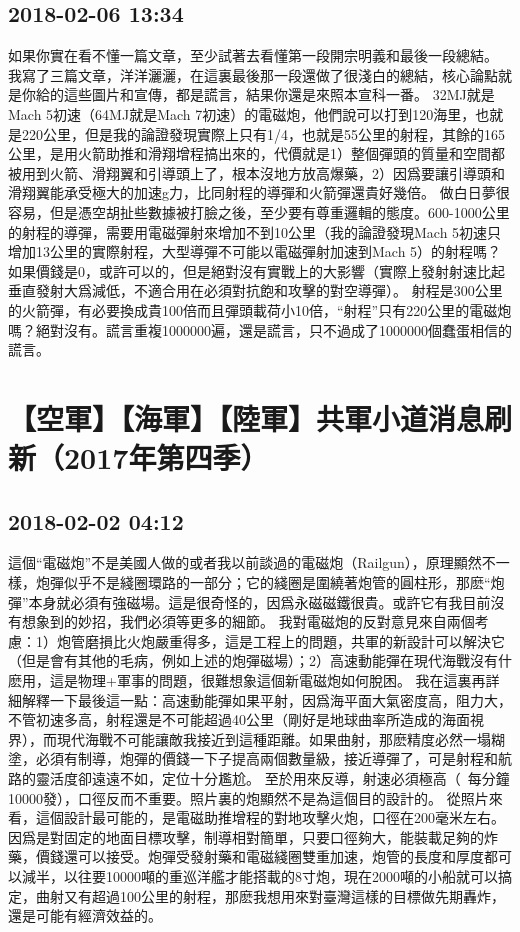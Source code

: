\documentclass[twocolumn]{ctexart}
\begin{document}
\subsection*{2018-02-06 13:34}

如果你實在看不懂一篇文章，至少試著去看懂第一段開宗明義和最後一段總結。
我寫了三篇文章，洋洋灑灑，在這裏最後那一段還做了很淺白的總結，核心論點就是你給的這些圖片和宣傳，都是謊言，結果你還是來照本宣科一番。
32MJ就是Mach 5初速（64MJ就是Mach 7初速）的電磁炮，他們說可以打到120海里，也就是220公里，但是我的論證發現實際上只有1/4，也就是55公里的射程，其餘的165公里，是用火箭助推和滑翔增程搞出來的，代價就是1）整個彈頭的質量和空間都被用到火箭、滑翔翼和引導頭上了，根本沒地方放高爆藥，2）因爲要讓引導頭和滑翔翼能承受極大的加速g力，比同射程的導彈和火箭彈還貴好幾倍。
做白日夢很容易，但是憑空胡扯些數據被打臉之後，至少要有尊重邏輯的態度。600-1000公里的射程的導彈，需要用電磁彈射來增加不到10公里（我的論證發現Mach 5初速只增加13公里的實際射程，大型導彈不可能以電磁彈射加速到Mach 5）的射程嗎？如果價錢是0，或許可以的，但是絕對沒有實戰上的大影響（實際上發射射速比起垂直發射大爲減低，不適合用在必須對抗飽和攻擊的對空導彈）。
射程是300公里的火箭彈，有必要換成貴100倍而且彈頭載荷小10倍，“射程”只有220公里的電磁炮嗎？絕對沒有。謊言重複1000000遍，還是謊言，只不過成了1000000個蠢蛋相信的謊言。
\section*{【空軍】【海軍】【陸軍】共軍小道消息刷新（2017年第四季）}
\subsection*{2018-02-02 04:12}

這個“電磁炮”不是美國人做的或者我以前談過的電磁炮（Railgun），原理顯然不一樣，炮彈似乎不是綫圈環路的一部分；它的綫圈是圍繞著炮管的圓柱形，那麽“炮彈”本身就必須有強磁場。這是很奇怪的，因爲永磁磁鐵很貴。或許它有我目前沒有想象到的妙招，我們必須等更多的細節。
我對電磁炮的反對意見來自兩個考慮：1）炮管磨損比火炮嚴重得多，這是工程上的問題，共軍的新設計可以解決它（但是會有其他的毛病，例如上述的炮彈磁場）；2）高速動能彈在現代海戰沒有什麽用，這是物理+軍事的問題，很難想象這個新電磁炮如何脫困。
我在這裏再詳細解釋一下最後這一點：高速動能彈如果平射，因爲海平面大氣密度高，阻力大，不管初速多高，射程還是不可能超過40公里（剛好是地球曲率所造成的海面視界），而現代海戰不可能讓敵我接近到這種距離。如果曲射，那麽精度必然一塌糊塗，必須有制導，炮彈的價錢一下子提高兩個數量級，接近導彈了，可是射程和航路的靈活度卻遠遠不如，定位十分尷尬。
至於用來反導，射速必須極高（~每分鐘10000發），口徑反而不重要。照片裏的炮顯然不是為這個目的設計的。
從照片來看，這個設計最可能的，是電磁助推增程的對地攻擊火炮，口徑在200毫米左右。因爲是對固定的地面目標攻擊，制導相對簡單，只要口徑夠大，能裝載足夠的炸藥，價錢還可以接受。炮彈受發射藥和電磁綫圈雙重加速，炮管的長度和厚度都可以減半，以往要10000噸的重巡洋艦才能搭載的8寸炮，現在2000噸的小船就可以搞定，曲射又有超過100公里的射程，那麽我想用來對臺灣這樣的目標做先期轟炸，還是可能有經濟效益的。
\end{document}
